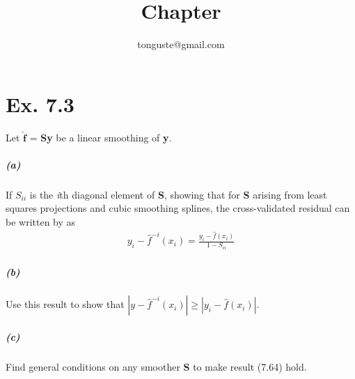 \documentclass[a4paper, 12pt]{article}
\title{Chapter \rom{7}}
\author{tonguste@gmail.com}
\begin{document}
    \maketitle
	\tableofcontents
    \section{Ex. 7.3 }

    Let $\hat{\textbf{f}}$ = \textbf{Sy} be a linear smoothing of \textbf{y}. 
    \subparagraph{(a)} If $S_{ii}$ is the \textit{i}th diagonal element of \textbf{S}, showing that for \textbf{S} arising from least
    squares projections and cubic smoothing splines, the cross-validated residual can be written by as
    \begin{align}
        y_i - \hat{f}^{-i}(x_i) = \frac{y_i-\hat{f}(x_i)}{1-S_{ii}}
    \end{align}
    \subparagraph{(b)} Use this result to show that $|y-\hat{f}^{-i}(x_i)| \geq |y_{i}-\hat{f}(x_i)|$.
    \subparagraph{(c)} Find general conditions on any smoother \textbf{S} to make result (7.64) hold.
\end{document}

